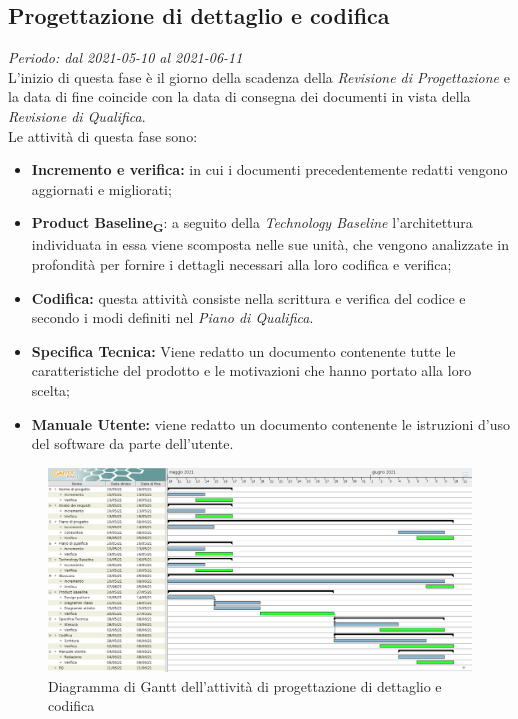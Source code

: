     \subsection{Progettazione di dettaglio e codifica}
        \textit{Periodo: dal 2021-05-10 al 2021-06-11}\\
        L’inizio di questa fase è il giorno della scadenza della \textit{Revisione di Progettazione} e la data di fine coincide con la data di consegna dei documenti in vista della \textit{Revisione di Qualifica}.\\
        Le attività di questa fase sono:
        \begin {itemize}
            \item \textbf{Incremento e verifica:} in cui i documenti precedentemente redatti vengono aggiornati e migliorati;
            \item \textbf{Product Baseline\textsubscript{\textbf{G}}}: a seguito della \textit{Technology Baseline} l’architettura individuata in essa viene scomposta nelle sue unità, che vengono analizzate in profondità per fornire i dettagli necessari alla loro codifica e verifica;
            \item \textbf{Codifica:} questa attività consiste nella scrittura e verifica del codice e secondo i modi definiti nel \textit{Piano di Qualifica}.
            \item \textbf{Specifica Tecnica:} Viene redatto un documento contenente tutte le caratteristiche
            del prodotto e le motivazioni che hanno portato alla loro scelta;
            \item \textbf{Manuale Utente:} viene redatto un documento contenente le istruzioni d'uso del software da parte dell'utente.
        \end {itemize}
        \begin{figure}[!ht]
            \caption{Diagramma di Gantt dell’attività di progettazione di dettaglio e codifica}
            \vspace{5px}
            \includegraphics[scale=0.23]{../../../Images/Diagrammi/Gantt/progettazioneCodifica.png}
            \centering
        \end{figure}
        

